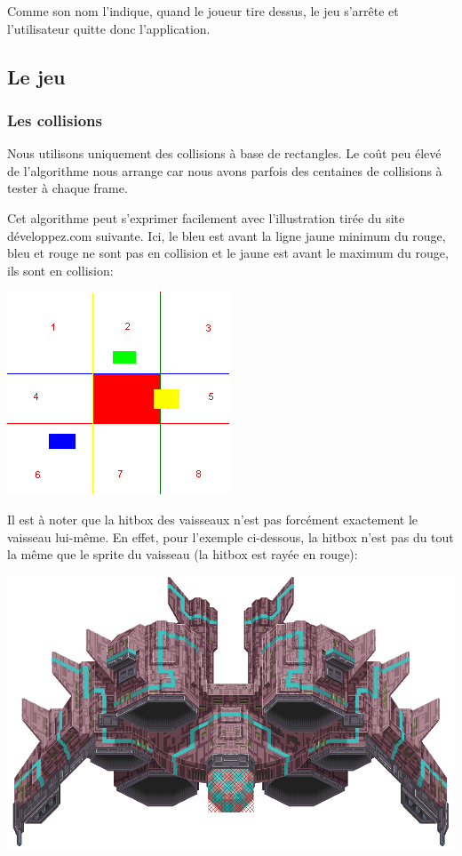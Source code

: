 \documentclass{article}
\begin{document}
Comme son nom l'indique, quand le joueur tire dessus, le jeu s'arrête et
l'utilisateur quitte donc l'application.

\subsection{Le jeu}

\subsubsection{Les collisions}

Nous utilisons uniquement des collisions à base de rectangles.
Le coût peu élevé de l'algorithme nous arrange car nous avons parfois des
centaines de collisions à tester à chaque frame. \newline


Cet algorithme peut s'exprimer facilement avec l'illustration tirée du
site développez.com suivante. Ici, le bleu est avant la ligne jaune minimum du
rouge, bleu et rouge ne sont pas en collision et le jaune est avant le maximum
du rouge, ils sont en collision:

\begin{center}
\includegraphics[scale= 0.8]{images/collision-boites.png}
\end{center}

Il est à noter que la hitbox des vaisseaux n'est pas forcément exactement le
vaisseau lui-même. En effet, pour l'exemple ci-dessous, la hitbox n'est pas du
tout la même que le sprite du vaisseau (la hitbox est rayée en rouge):

\begin{center}
\includegraphics[scale= 0.4]{images/carrierhit.png}
\end{center}
\end{document}
